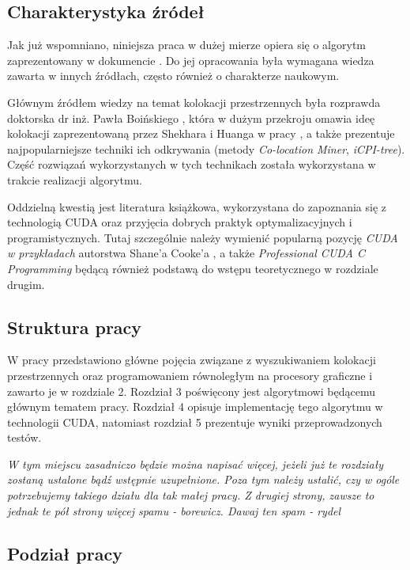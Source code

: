 \documentclass[12pt]{article}
\begin{document}
\subsection{Charakterystyka źródeł}

Jak już wspomniano, niniejsza praca w dużej mierze opiera się o algorytm zaprezentowany w dokumencie \cite{chinczyki}. Do jej opracowania była wymagana wiedza zawarta w innych źródłach, często również o charakterze naukowym.

Głównym źródłem wiedzy na temat kolokacji przestrzennych była rozprawda doktorska dr inż. Pawła Boińskiego \cite{boinski}, która w dużym przekroju omawia ideę kolokacji zaprezentowaną przez Shekhara i Huanga w pracy \cite{huang}, a także prezentuje najpopularniejsze techniki ich odkrywania (metody \textit{Co-location Miner}, \textit{iCPI-tree}). Część rozwiązań wykorzystanych w tych technikach została wykorzystana w trakcie realizacji algorytmu.

Oddzielną kwestią jest literatura książkowa, wykorzystana do zapoznania się z technologią CUDA oraz przyjęcia dobrych praktyk optymalizacyjnych i programistycznych. Tutaj szczególnie należy wymienić popularną pozycję \textit{CUDA w przykładach} autorstwa Shane'a Cooke'a \cite{cuda_by_examples}, a także \textit{Professional CUDA C Programming} \cite{professional_cuda} będącą również podstawą do wstępu teoretycznego w rozdziale drugim.

\subsection{Struktura pracy}

W pracy przedstawiono główne pojęcia związane z wyszukiwaniem kolokacji przestrzennych oraz programowaniem równoległym na procesory graficzne i zawarto je w rozdziale 2. Rozdział 3 poświęcony jest algorytmowi będącemu głównym tematem pracy. Rozdział 4 opisuje implementację tego algorytmu w technologii CUDA, natomiast rozdział 5 prezentuje wyniki przeprowadzonych testów.

\textit{W tym miejscu zasadniczo będzie można napisać więcej, jeżeli już te rozdziały zostaną ustalone bądź wstępnie uzupełnione. Poza tym należy ustalić, czy w ogóle potrzebujemy takiego działu dla tak małej pracy. Z drugiej strony, zawsze to jednak te pół strony więcej spamu - borewicz. Dawaj ten spam - rydel}

\subsection{Podział pracy}
\end{document}
